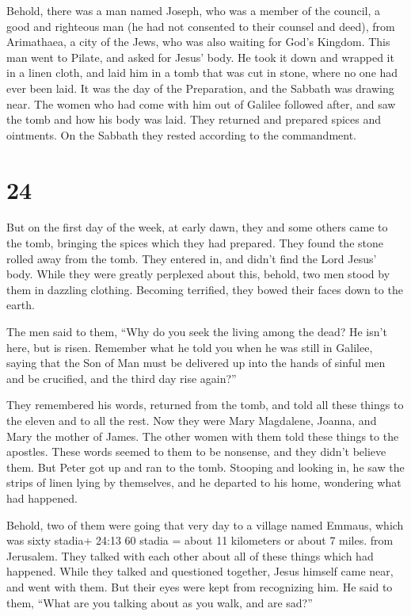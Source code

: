  Behold, there was a man named Joseph, who was a member of
the council, a good and righteous man  (he had not
consented to their counsel and deed), from Arimathaea, a city of the
Jews, who was also waiting for God's Kingdom.  This man
went to Pilate, and asked for Jesus' body.  He took it down
and wrapped it in a linen cloth, and laid him in a tomb that was cut in
stone, where no one had ever been laid.  It was the day of
the Preparation, and the Sabbath was drawing near.  The
women who had come with him out of Galilee followed after, and saw the
tomb and how his body was laid.  They returned and prepared
spices and ointments. On the Sabbath they rested according to the
commandment.

\hypertarget{section-23}{%
\section{24}\label{section-23}}

 But on the first day of the week, at early dawn, they and
some others came to the tomb, bringing the spices which they had
prepared.  They found the stone rolled away from the tomb.
 They entered in, and didn't find the Lord Jesus' body.
 While they were greatly perplexed about this, behold, two
men stood by them in dazzling clothing.  Becoming terrified,
they bowed their faces down to the earth.

The men said to them, ``Why do you seek the living among the dead?
 He isn't here, but is risen. Remember what he told you when
he was still in Galilee,  saying that the Son of Man must be
delivered up into the hands of sinful men and be crucified, and the
third day rise again?''

 They remembered his words,  returned from the
tomb, and told all these things to the eleven and to all the rest.
 Now they were Mary Magdalene, Joanna, and Mary the mother
of James. The other women with them told these things to the apostles.
 These words seemed to them to be nonsense, and they didn't
believe them.  But Peter got up and ran to the tomb.
Stooping and looking in, he saw the strips of linen lying by themselves,
and he departed to his home, wondering what had happened.

 Behold, two of them were going that very day to a village
named Emmaus, which was sixty stadia+ 24:13 60 stadia = about 11
kilometers or about 7 miles. from Jerusalem.  They talked
with each other about all of these things which had happened.
 While they talked and questioned together, Jesus himself
came near, and went with them.  But their eyes were kept
from recognizing him.  He said to them, ``What are you
talking about as you walk, and are sad?''


